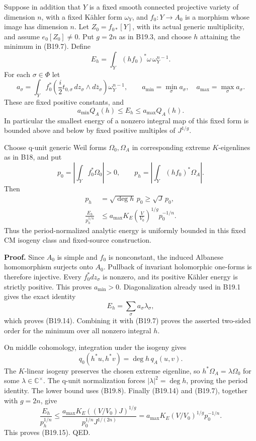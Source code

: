 \documentclass[11pt,a4paper]{article}
\theoremstyle{definition}
\begin{document}
Suppose in addition that \(Y\) is a fixed smooth connected projective variety of dimension \(n\), with a fixed Kähler form \(\omega_Y\), and \(f_0:Y\to A_0\) is a morphism whose image has dimension \(n\). Let \(Z_0=f_{0*}[Y]\), with its actual generic multiplicity, and assume \(e_0[Z_0]\ne0\). Put \(g=2n\) as in B19.3, and choose \(h\) attaining the minimum in (B19.7). Define \[
 E_h=\int_Y(hf_0)^*\omega\,\omega_Y^{n-1}.
\] For each \(\sigma\in\Phi\) let \[
 a_\sigma=\int_Yf_0^*\left(\frac i2t_{0,\sigma}\,dz_\sigma\wedge d\bar z_\sigma\right)
                  \omega_Y^{n-1},\qquad
 a_{\min}=\min_\sigma a_\sigma,\quad a_{\max}=\max_\sigma a_\sigma.
\] These are fixed positive constants, and \[
 a_{\min}Q_A(h)\le E_h\le a_{\max}Q_A(h).
\tag{B19.14}
\] In particular the smallest energy of a nonzero integral map of this fixed form is bounded above and below by fixed positive multiples of \(J^{1/g}\).

Choose q-unit generic Weil forms \(\Omega_0,\Omega_A\) in corresponding extreme \(K\)-eigenlines as in B18, and put \[
 p_0=\left|\int_Yf_0^*\Omega_0\right|>0,\qquad
 p_h=\left|\int_Y(hf_0)^*\Omega_A\right|.
\] Then \[
 \begin{aligned}
 p_h&=\sqrt{\deg h}\,p_0\ge\sqrt J\,p_0,\\
 \frac{E_h}{p_h^{1/n}}
 &\le a_{\max}K_E\left(\frac{V}{V_0}\right)^{1/g}p_0^{-1/n}.
 \end{aligned}
\tag{B19.15}
\] Thus the period-normalized analytic energy is uniformly bounded in this fixed CM isogeny class and fixed-source construction.

\textbf{Proof.} Since \(A_0\) is simple and \(f_0\) is nonconstant, the induced Albanese homomorphism surjects onto \(A_0\). Pullback of invariant holomorphic one-forms is therefore injective. Every \(f_0^*dz_\sigma\) is nonzero, and its positive Kähler energy is strictly positive. This proves \(a_{\min}>0\). Diagonalization already used in B19.1 gives the exact identity \[
 E_h=\sum_\sigma a_\sigma\lambda_\sigma,
\] which proves (B19.14). Combining it with (B19.7) proves the asserted two-sided order for the minimum over all nonzero integral \(h\).

On middle cohomology, integration under the isogeny gives \[
 q_0(h^*u,h^*v)=\deg h\,q_A(u,v).
\] The \(K\)-linear isogeny preserves the chosen extreme eigenline, so \(h^*\Omega_A=\lambda\Omega_0\) for some \(\lambda\in\mathbb C^\times\). The q-unit normalization forces \(|\lambda|^2=\deg h\), proving the period identity. The lower bound uses (B19.8). Finally (B19.14) and (B19.7), together with \(g=2n\), give \[
 \frac{E_h}{p_h^{1/n}}
 \le\frac{a_{\max}K_E((V/V_0)J)^{1/g}}
          {p_0^{1/n}J^{1/(2n)}}
 =a_{\max}K_E(V/V_0)^{1/g}p_0^{-1/n}.
\] This proves (B19.15). QED.
\end{document}
